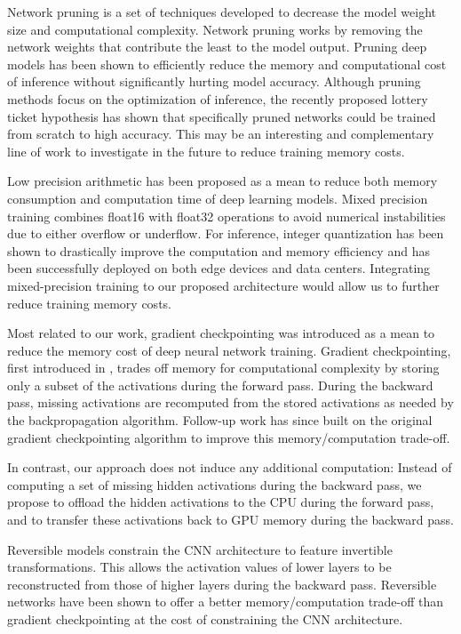 \documentclass[11pt,onecolumn]{article}
\begin{document}
Network pruning \cite{molchanov2016pruning} is a set of techniques 
developed to decrease the model weight size and computational complexity.
Network pruning works by removing the network weights that contribute the least to the model output.
Pruning deep models has been shown to efficiently reduce the memory 
and computational cost of inference without  significantly hurting model accuracy.
Although pruning methods focus on the optimization of inference, 
the recently proposed lottery ticket hypothesis \cite{frankle2018lottery} 
has shown that specifically pruned networks could  be trained from scratch to high accuracy.
This may be an interesting and complementary line of work to investigate in the future to reduce training memory costs.

Low precision arithmetic has been proposed as a mean to reduce 
both memory consumption and computation time of deep learning models.
Mixed precision training \cite{micikevicius2017mixed} combines float16 with float32 operations
to avoid numerical instabilities due to either overflow or underflow.
For inference,  integer quantization \cite{jacob2018quantization,wu2018training} 
has been shown to drastically improve the computation and memory efficiency 
and has been successfully deployed on both edge devices and data centers.
Integrating mixed-precision training to our proposed architecture would allow 
us to further reduce training memory costs. 

Most related to our work, gradient checkpointing was introduced as a mean 
to reduce the memory cost of deep neural network training.
Gradient checkpointing, first introduced in \cite{martens2012training}, 
trades off memory for computational complexity by storing only a subset 
of the activations during the forward pass.
During the backward pass, missing activations are recomputed from 
the stored activations as needed by the backpropagation algorithm.
Follow-up work \cite{chen2016training} has since built on the original gradient 
checkpointing algorithm to improve this memory/computation trade-off.  

In contrast, our approach does not induce any additional computation:
Instead of computing a set of missing hidden activations during the backward pass,
we propose to offload the hidden activations to the CPU during the forward pass,
and to transfer these activations back to GPU memory during the backward pass.

Reversible models \cite{gomez2017reversible,jacobsen2018revnet} constrain the CNN architecture to feature invertible transformations.
This allows the activation values of lower layers to be reconstructed from those of higher layers during
the backward pass. 
Reversible networks have been shown to offer a better memory/computation trade-off than 
gradient checkpointing at the cost of constraining the CNN architecture.
\end{document}
